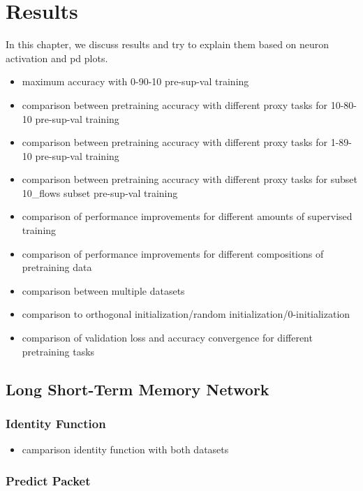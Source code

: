 \chapter{Results} \label{sec:results}

In this chapter, we discuss results and try to explain them based on neuron activation and \gls{pd} plots.

\begin{itemize}
	\item maximum accuracy with 0-90-10 pre-sup-val training
	\item comparison between pretraining accuracy with different proxy tasks for 10-80-10 pre-sup-val training
	\item comparison between pretraining accuracy with different proxy tasks for 1-89-10 pre-sup-val training
	\item comparison between pretraining accuracy with different proxy tasks for subset 10\_flows subset pre-sup-val training
	\item comparison of performance improvements for different amounts of supervised training
	\item comparison of performance improvements for different compositions of pretraining data
	\item comparison between multiple datasets
	\item comparison to orthogonal initialization/random initialization/0-initialization
	\item comparison of validation loss and accuracy convergence for different pretraining tasks
\end{itemize} 

\section{Long Short-Term Memory Network} \label{sec:results:lstm}

\subsection{Identity Function} \label{sec:results:lstm:identity}

\begin{itemize}
	\item camparison identity function with both datasets 
\end{itemize} 

\subsection{Predict Packet} \label{sec:results:lstm:predict_packet}

